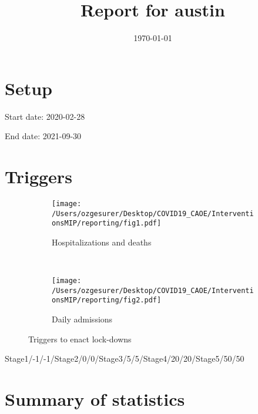 \documentclass{article}
\title{Report for austin}
\author{}
\date{\today}
\begin{document}
\maketitle

\section*{Setup}

Start date: 2020-02-28

End date: 2021-09-30 




\section*{Triggers}
\begin{figure}[!htb]
  \centering
  \setlength{\unitlength}{1cm}
    \begin{subfigure}[b]{0.475\linewidth}
    \centering
        \texttt{[image: /Users/ozgesurer/Desktop/COVID19\_CAOE/InterventionsMIP/reporting/fig1.pdf]}
        \caption{Hospitalizations  and deaths}
        \label{fig:IHD}
    \end{subfigure}
    ~
    \begin{subfigure}[b]{0.475\linewidth}
    \centering
         \texttt{[image: /Users/ozgesurer/Desktop/COVID19\_CAOE/InterventionsMIP/reporting/fig2.pdf]}
        \caption{Daily admissions}
        \label{fig:IYIH}
    \end{subfigure}
    \caption{Triggers to enact lock-downs}\label{fig:SD90}
\end{figure}

Stage1/-1/-1/Stage2/0/0/Stage3/5/5/Stage4/20/20/Stage5/50/50

\newpage

\section*{Summary of statistics}
\end{document}
